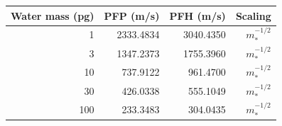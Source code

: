 \begin{tabular}{rrrr}\toprule
Water mass (pg) & PFP (m/s) & PFH (m/s) & Scaling\\\midrule
1 & 2333.4834 & 3040.4350 & $m_*^{-1/2}$\\
3 & 1347.2373 & 1755.3960 & $m_*^{-1/2}$\\
10 & 737.9122 & 961.4700 & $m_*^{-1/2}$\\
30 & 426.0338 & 555.1049 & $m_*^{-1/2}$\\
100 & 233.3483 & 304.0435 & $m_*^{-1/2}$\\
\bottomrule\end{tabular}

